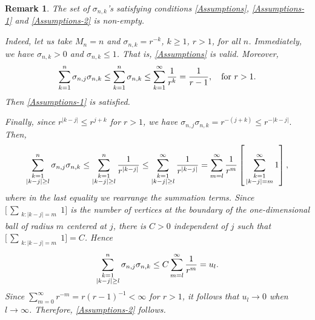 \documentclass[12pt]{article}
\newtheorem{remark}[theorem]{Remark}
\theoremstyle{definition}
\begin{document}
\begin{remark}
The set of $\sigma_{n,k}$'s satisfying conditions \eqref{Assumptions}, \eqref{Assumptions-1} and \eqref{Assumptions-2} is non-empty. 

Indeed, let us take $M_n=n$  and  $\sigma_{n,k}=r^{-k}$,
$k\geq 1$, $r>1$, for all $n$. 
Immediately, we have $\sigma_{n,k}>0$ and $\sigma_{n,k}\leq 1$.
That is, \eqref{Assumptions} is valid.
Moreover,
\begin{align*}
\sum_{k=1}^{n} \sigma_{n,j}\sigma_{n,k}
\leq 
\sum_{k=1}^{n} \sigma_{n,k}
\leq 
\sum_{k=1}^{\infty} {1\over r^k}
=
{1\over r-1}, 
\quad \text{for} \ r>1.
\end{align*}
%
Then \eqref{Assumptions-1} is satisfied.

Finally, since  $r^{\vert k-j\vert}\leq r^{j+k}$ for $r>1$, we have
$
\sigma_{n,j}\sigma_{n,k}
=
r^{-(j+k)}
\leq 
r^{-\vert k-j\vert}.
$
Then,
\begin{align*}
\sum_{\substack{k=1 \\ \vert k-j\vert\geq l}}^{n} 
\sigma_{n,j} \sigma_{n,k}
\leq 
\sum_{\substack{k=1 \\ \vert k-j\vert\geq l}}^{n} 
{1\over r^{\vert k-j\vert}}
\leq
\sum_{\substack{k=1 \\ \vert k-j\vert\geq l}}^{\infty} 
{1\over r^{\vert k-j\vert}}
=
\sum_{m=l}^{\infty}
{1\over r^{m}}
\left[ \,
\sum_{\substack{k=1 \\ \vert k-j\vert= m}}^{\infty} 
1
\right],
\end{align*}
where in the last equality we rearrange the summation terms. Since
$\big[ \,
\sum_{\substack{k: \vert k-j\vert= m}}1 \big]$
is the number of vertices at the boundary of the one-dimensional
 ball of
radius $m$ centered at $j$, there is $C> 0$ independent of $j$ such that $\big[ \,
\sum_{\substack{k: \vert k-j\vert= m}}1 \big]=C$. Hence
\begin{align*}
\sum_{\substack{k=1 \\ \vert k-j\vert\geq l}}^{n} 
\sigma_{n,j} \sigma_{n,k}
\leq 
C \sum_{m=l}^{\infty}
{1\over r^{m}} = u_l.
\end{align*}
Since $\sum_{m=0}^{\infty}{r^{-m}}=r(r-1)^{-1}<\infty$ for $r>1$, it follows that $u_l\to 0$ when $l\to \infty$.
Therefore, \eqref{Assumptions-2} follows.
\end{remark}
\end{document}

